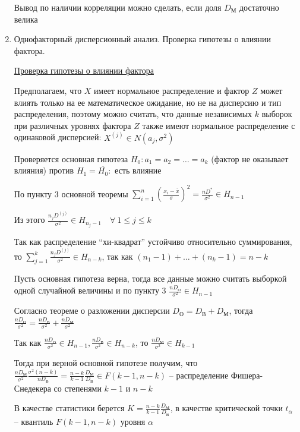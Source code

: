 \documentclass[12pt]{article}
\begin{document}
\begin{enumerate}
    Вывод по наличии корреляции можно сделать, если доля $D_\text{М}$ достаточно велика

    \item Однофакторный дисперсионный анализ. Проверка гипотезы о влиянии фактора.

    \hyperlink{factor_influence_hypothesis}{Проверка гипотезы о влиянии фактора}
    
    Предполагаем, что $X$ имеет нормальное распределение и фактор $Z$ может влиять только на ее математическое ожидание, 
    но не на дисперсию и тип распределения, поэтому можно считать, что данные независимых $k$ выборок при различных уровнях фактора $Z$
    также имеют нормальное распределение с одинаковой дисперсией: $X^{(j)} \in N(a_j, \sigma^2)$

    Проверяется основная гипотеза $H_0 : a_1 = a_2 = \dots = a_k$ (фактор не оказывает влияния) против $H_1 = \overline{H_0} : $ есть влияние

    По пункту 3 основной теоремы $\sum_{i = 1}^n \left(\frac{x_i - \overline{x}}{\sigma}\right)^2 = \frac{n D^*}{\sigma^2} \in H_{n - 1}$

    Из этого $\frac{n_j D^{(j)}}{\sigma^2} \in H_{n_j - 1} \quad \forall \ 1 \leq j \leq k$

    Так как распределение \enquote{хи-квадрат} устойчиво относительно суммирования, то $\sum_{j = 1}^k \frac{n_j D^{(j)}}{\sigma^2} \in H_{n - k}$, так как
    $(n_1 - 1) + \dots + (n_k - 1) = n - k$

    Пусть основная гипотеза верна, тогда все данные можно считать выборкой одной случайной величины и по пункту 3 $\frac{n D_{\text{О}}}{\sigma^2} \in H_{n - 1}$

    Согласно теореме о разложении дисперсии $D_\text{О} = D_\text{В} + D_\text{М}$, тогда $\frac{n D_{\text{О}}}{\sigma^2} = \frac{n D_{\text{В}}}{\sigma^2} + \frac{n D_{\text{М}}}{\sigma^2}$

    Так как $\frac{n D_{\text{О}}}{\sigma^2} \in H_{n - 1}, \frac{n D_{\text{В}}}{\sigma^2} \in H_{n - k}$, то $\frac{n D_{\text{М}}}{\sigma^2} \in H_{k - 1}$

    Тогда при верной основной гипотезе получим, что $\frac{n D_{\text{М}}}{\sigma^2} \frac{\sigma^2 (n - k)}{n D_\text{В}} = \frac{n - k}{k - 1} \frac{D_\text{М}}{D_\text{В}} \in F(k - 1, n - k)$ --
    распределение Фишера-Снедекера со степенями $k - 1$ и $n - k$

    В качестве статистики берется $K = \frac{n - k}{k - 1} \frac{D_\text{М}}{D_\text{В}}$, в качестве критической точки $t_\alpha$ -- квантиль $F(k - 1, n - k)$ уровня $\alpha$


\end{enumerate}
\end{document}
